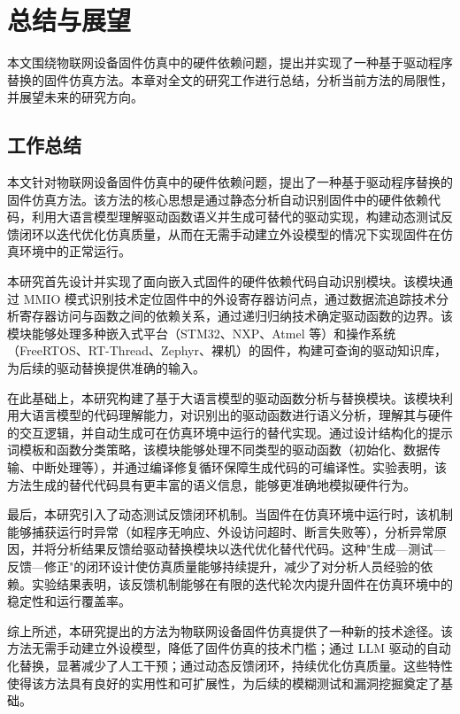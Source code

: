 \chapter{总结与展望}
\label{chap:conclusion}

本文围绕物联网设备固件仿真中的硬件依赖问题，提出并实现了一种基于驱动程序替换的固件仿真方法。本章对全文的研究工作进行总结，分析当前方法的局限性，并展望未来的研究方向。

\section{工作总结}
\label{sec:summary}

本文针对物联网设备固件仿真中的硬件依赖问题，提出了一种基于驱动程序替换的固件仿真方法。该方法的核心思想是通过静态分析自动识别固件中的硬件依赖代码，利用大语言模型理解驱动函数语义并生成可替代的驱动实现，构建动态测试反馈闭环以迭代优化仿真质量，从而在无需手动建立外设模型的情况下实现固件在仿真环境中的正常运行。

本研究首先设计并实现了面向嵌入式固件的硬件依赖代码自动识别模块。该模块通过 MMIO 模式识别技术定位固件中的外设寄存器访问点，通过数据流追踪技术分析寄存器访问与函数之间的依赖关系，通过递归归纳技术确定驱动函数的边界。该模块能够处理多种嵌入式平台（STM32、NXP、Atmel 等）和操作系统（FreeRTOS、RT-Thread、Zephyr、裸机）的固件，构建可查询的驱动知识库，为后续的驱动替换提供准确的输入。

在此基础上，本研究构建了基于大语言模型的驱动函数分析与替换模块。该模块利用大语言模型的代码理解能力，对识别出的驱动函数进行语义分析，理解其与硬件的交互逻辑，并自动生成可在仿真环境中运行的替代实现。通过设计结构化的提示词模板和函数分类策略，该模块能够处理不同类型的驱动函数（初始化、数据传输、中断处理等），并通过编译修复循环保障生成代码的可编译性。实验表明，该方法生成的替代代码具有更丰富的语义信息，能够更准确地模拟硬件行为。

最后，本研究引入了动态测试反馈闭环机制。当固件在仿真环境中运行时，该机制能够捕获运行时异常（如程序无响应、外设访问超时、断言失败等），分析异常原因，并将分析结果反馈给驱动替换模块以迭代优化替代代码。这种"生成—测试—反馈—修正"的闭环设计使仿真质量能够持续提升，减少了对分析人员经验的依赖。实验结果表明，该反馈机制能够在有限的迭代轮次内提升固件在仿真环境中的稳定性和运行覆盖率。

综上所述，本研究提出的方法为物联网设备固件仿真提供了一种新的技术途径。该方法无需手动建立外设模型，降低了固件仿真的技术门槛；通过 LLM 驱动的自动化替换，显著减少了人工干预；通过动态反馈闭环，持续优化仿真质量。这些特性使得该方法具有良好的实用性和可扩展性，为后续的模糊测试和漏洞挖掘奠定了基础。


